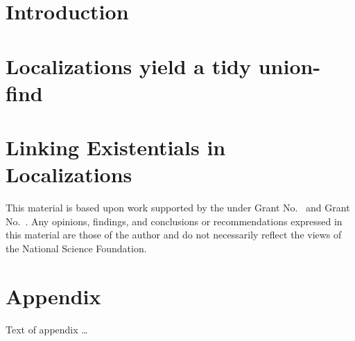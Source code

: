 \documentclass[acmsmall,review,anonymous]{acmart}\settopmatter{printfolios=true,printccs=false,printacmref=false}
\begin{document}




\maketitle

\section{Introduction}
\label{sec:intro}


\section{Localizations yield a tidy union-find}
\label{sec:orientation}


\section{Linking Existentials in Localizations}
\label{sec:localizations}


\begin{acks}                            %
  This material is based upon work supported by the
   under Grant
  No.~ and Grant
  No.~.  Any opinions, findings, and
  conclusions or recommendations expressed in this material are those
  of the author and do not necessarily reflect the views of the
  National Science Foundation.
\end{acks}





\appendix
\section{Appendix}

Text of appendix \ldots
\end{document}

